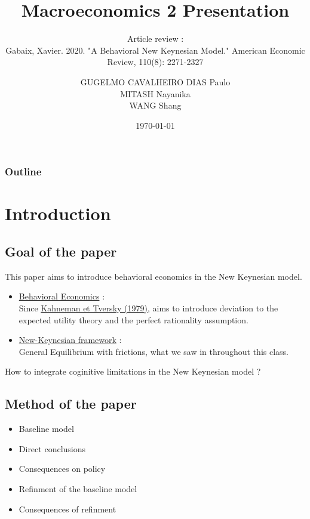 \documentclass{beamer}
\title{Macroeconomics 2 Presentation}
\subtitle{Article review :\\ Gabaix, Xavier. 2020. "A Behavioral New Keynesian Model." American Economic Review, 110(8): 2271-2327}
\author{GUGELMO CAVALHEIRO DIAS Paulo \\ MITASH Nayanika \\ WANG Shang}
\institute{Sciences Po}
\date{\today}
\newcommand\ReduceFont{\fontsize{10}{7.2}\selectfont}
\begin{document}
\begin{frame}
    \titlepage
\end{frame}

\begin{frame}
    \ReduceFont
    \frametitle{Outline}
    \tableofcontents[hideallsubsections]
\end{frame}

\section{Introduction}
\begin{frame}
    \tableofcontents[currentsection, hideothersubsections, sections=\value{section}]
\end{frame}

\subsection{Goal of the paper}
\begin{frame}{\subsecname}
    This paper aims to introduce behavioral economics in the New Keynesian model. \\
    \begin{itemize}
        \item \underline{Behavioral Economics} : \\ Since \hyperlink{https://www.jstor.org/stable/1914185}{Kahneman et Tversky (1979)}, aims to introduce deviation to the expected utility theory and the perfect rationality assumption.
        \item \underline{New-Keynesian framework} : \\ General Equilibrium with frictions, what we saw in throughout this class.
    \end{itemize}
    How to integrate coginitive limitations in the New Keynesian model ?
\end{frame}

\subsection{Method of the paper}
\begin{frame}{\subsecname}
\begin{itemize}
    \item Baseline model
    \item Direct conclusions
    \item Consequences on policy
    \item Refinment of the baseline model
    \item Consequences of refinment
\end{itemize}
\end{frame}
\end{document}
